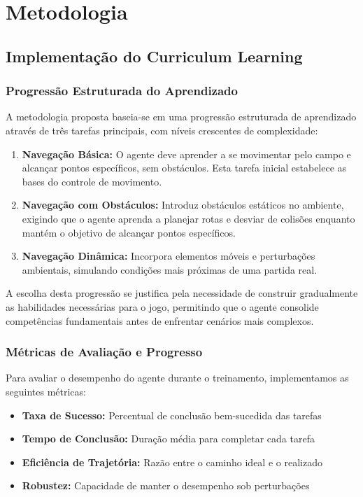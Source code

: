 \chapter{Metodologia}
\label{cap:metodologia}

\section{Implementação do Curriculum Learning}

\subsection{Progressão Estruturada do Aprendizado}

A metodologia proposta baseia-se em uma progressão estruturada de aprendizado através de três tarefas principais, com níveis crescentes de complexidade:

\begin{enumerate}
    \item \textbf{Navegação Básica:} O agente deve aprender a se movimentar pelo campo e alcançar pontos específicos, sem obstáculos. Esta tarefa inicial estabelece as bases do controle de movimento.
    
    \item \textbf{Navegação com Obstáculos:} Introduz obstáculos estáticos no ambiente, exigindo que o agente aprenda a planejar rotas e desviar de colisões enquanto mantém o objetivo de alcançar pontos específicos.
    
    \item \textbf{Navegação Dinâmica:} Incorpora elementos móveis e perturbações ambientais, simulando condições mais próximas de uma partida real.
\end{enumerate}

A escolha desta progressão se justifica pela necessidade de construir gradualmente as habilidades necessárias para o jogo, permitindo que o agente consolide competências fundamentais antes de enfrentar cenários mais complexos.

\subsection{Métricas de Avaliação e Progresso}

Para avaliar o desempenho do agente durante o treinamento, implementamos as seguintes métricas:

\begin{itemize}
    \item \textbf{Taxa de Sucesso:} Percentual de conclusão bem-sucedida das tarefas
    \item \textbf{Tempo de Conclusão:} Duração média para completar cada tarefa
    \item \textbf{Eficiência de Trajetória:} Razão entre o caminho ideal e o realizado
    \item \textbf{Robustez:} Capacidade de manter o desempenho sob perturbações
\end{itemize}

